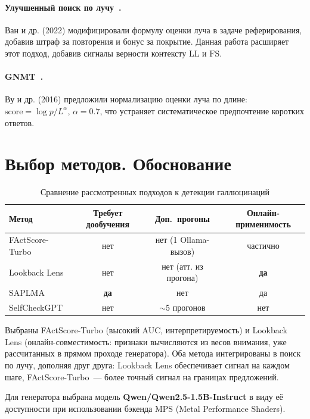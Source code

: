 \documentclass[a4paper,12pt]{extarticle}
\newcommand{\LL}{\mathrm{LL}}
\newcommand{\FS}{\mathrm{FS}}
\begin{document}
\paragraph{Улучшенный поиск по лучу~\cite{wan2022}.}
Ван и др. (2022) модифицировали формулу оценки луча в задаче реферирования,
добавив штраф за повторения и бонус за покрытие. Данная работа расширяет
этот подход, добавив сигналы верности контексту $\LL$ и $\FS$.

\paragraph{GNMT~\cite{gnmt}.}
Ву и др. (2016) предложили нормализацию оценки луча по длине:
$\text{score} = \log p / L^\alpha$, $\alpha = 0.7$, что устраняет систематическое
предпочтение коротких ответов.

\section{Выбор методов. Обоснование}
\label{sec:method_choice}

\begin{table}[H]
\centering
\caption{Сравнение рассмотренных подходов к детекции галлюцинаций}
\label{tab:comparison}
\small
\begin{tabular}{lccc}
\toprule
\textbf{Метод} & \textbf{Требует дообучения} & \textbf{Доп.\ прогоны}
  & \textbf{Онлайн-применимость} \\
\midrule
FActScore-Turbo & нет & нет (1 Ollama-вызов) & частично \\
Lookback Lens   & нет & нет (атт. из прогона) & \textbf{да} \\
SAPLMA          & \textbf{да} & нет & да \\
SelfCheckGPT    & нет & $\sim$5 прогонов & нет \\
\bottomrule
\end{tabular}
\end{table}

Выбраны FActScore-Turbo (высокий AUC, интерпретируемость) и Lookback Lens
(онлайн-совместимость: признаки вычисляются из весов внимания, уже
рассчитанных в прямом проходе генератора). Оба метода интегрированы в
поиск по лучу, дополняя друг друга: Lookback Lens обеспечивает сигнал на
каждом шаге, FActScore-Turbo~--- более точный сигнал на границах предложений.

Для генератора выбрана модель \textbf{Qwen/Qwen2.5-1.5B-Instruct} в виду её
доступности при использовании бэкенда MPS (Metal Performance Shaders).
\end{document}
